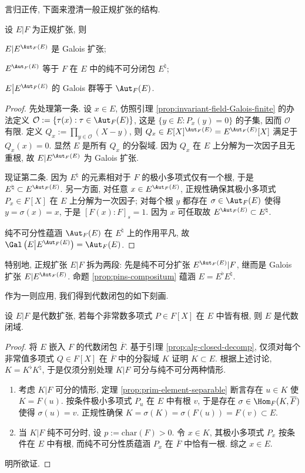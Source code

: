 言归正传, 下面来澄清一般正规扩张的结构.
\begin{theorem}\label{prop:normal-ext-structure}
	设 $E|F$ 为正规扩张, 则
	\begin{compactitem}
		\item $E|E^{\Aut_F(E)}$ 是 Galois 扩张;
		\item $E^{\Aut_F(E)}$ 等于 $F$ 在 $E$ 中的纯不可分闭包 $E^\natural$;
		\item $E \big| E^{\Aut_F(E)}$ 的 Galois 群等于 $\Aut_F(E)$.
	\end{compactitem}
\end{theorem}
\begin{proof}
	先处理第一条. 设 $x \in E$, 仿照引理 \ref{prop:invariant-field-Galois-finite} 的办法定义 $\mathcal{O} := \{\tau(x) : \tau \in \Aut_F(E) \}$, 这是 $\{y \in E: P_x(y)=0 \}$ 的子集, 因而 $\mathcal{O}$ 有限. 定义 $Q_x := \prod_{y \in \mathcal{O}} (X-y)$, 则 $Q_x \in E[X]^{\Aut_F(E)} = E^{\Aut_F(E)}[X]$ 满足于 $Q_x(x)=0$. 显然 $E$ 是所有 $Q_x$ 的分裂域. 因为 $Q_x$ 在 $E$ 上分解为一次因子且无重根, 故 $E|E^{\Aut_F(E)}$ 为 Galois 扩张.

	现证第二条. 因为 $E^\natural$ 的元素相对于 $F$ 的极小多项式仅有一个根, 于是 $E^\natural \subset E^{\Aut_F(E)}$. 另一方面, 对任意 $x \in E^{\Aut_F(E)}$, 正规性确保其极小多项式 $P_x \in F[X]$ 在 $E$ 上分解为一次因子; 对每个根 $y$ 都存在 $\sigma \in \Aut_F(E)$ 使得 $y = \sigma(x) = x$, 于是 $[F(x):F]_s = 1$. 因为 $x$ 可任取故 $E^{\Aut_F(E)} \subset E^\natural$.
	
	纯不可分性蕴涵 $\Aut_F(E)$ 在 $E^\natural$ 上的作用平凡, 故 $\Gal\left( E \big| E^{\Aut_F(E)} \right) = \Aut_F(E)$.
\end{proof}
特别地, 正规扩张 $E|F$ 拆为两段: 先是纯不可分扩张 $E^{\Aut_F(E)}|F$, 继而是 Galois 扩张 $E|E^{\Aut_F(E)}$. 命题 \ref{prop:pins-compositum} 蕴涵 $E=E^\flat E^\natural$.

作为一则应用, 我们得到代数闭包的如下刻画.
\begin{proposition}\label{prop:alg-closed-root}
	设 $E|F$ 是代数扩张, 若每个非常数多项式 $P \in F[X]$ 在 $E$ 中皆有根, 则 $E$ 是代数闭域.
\end{proposition}
\begin{proof}
	将 $E$ 嵌入 $F$ 的代数闭包 $\overline{F}$. 基于引理 \ref{prop:alg-closed-decomp}, 仅须对每个非常值多项式 $Q \in F[X]$ 在 $\overline{F}$ 中的分裂域 $K$ 证明 $K \subset E$. 根据上述讨论, $K = K^\flat K^\natural$, 于是仅须分别处理 $K|F$ 可分与纯不可分两种情形.
	
	\begin{enumerate}
		\item 考虑 $K|F$ 可分的情形, 定理 \ref{prop:prim-element-separable} 断言存在 $u \in K$ 使 $K=F(u)$. 按条件极小多项式 $P_u$ 在 $E$ 中有根 $v$, 于是存在 $\sigma \in \Hom_F(K, \overline{F})$ 使得 $\sigma(u)=v$. 正规性确保 $K = \sigma(K) = \sigma(F(u)) = F(v) \subset E$.
		\item 当 $K|F$ 纯不可分时, 设 $p := \text{char}(F) > 0$. 令 $x \in K$, 其极小多项式 $P_x$ 按条件在 $E$ 中有根, 而纯不可分性质蕴涵 $P_x$ 在 $\overline{F}$ 中恰有一根. 综之 $x \in E$.
	\end{enumerate}
	明所欲证.
\end{proof}


